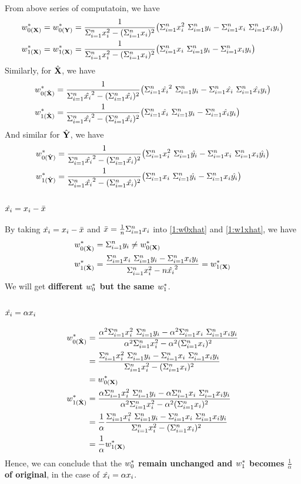 \documentclass[11pt,a4paper]{article}
\begin{document}
From above series of computatoin, we have
\begin{align}
    w_{0(\X)}^* = w_{0(\Y)}^* &= \deta  \big(\sxis \ \sy - \sxi \ \sxy\big) \\
    w_{1(\X)}^* = w_{1(\X)}^* &= \deta  \big(\sxi \ \sy -  \sxy\big) 
\end{align}
Similarly, for $\hat{\mathbf{X}} $, we have
\begin{align} \label{1:w0xhat}
    w_{0(\Xhat)}^* &= \detahat  \big(\sxihats \ \sy - \sxihat \ \sxhaty \big) \\
    w_{1(\Xhat)}^* &= \detahat  \big(\sxihat \ \sy -  \sxhaty \big)
    \label{1:w1xhat}
\end{align}
And similar for $\hat{\mathbf{Y}}$, we have
\begin{align}
    w_{0(\hat{\mathbf{Y}})}^* &= \frac{1}{\Sigma_{i=1}^{n} \hat{x_i}^2 - (\Sigma_{i=1}^{n} \hat{x_i})^2}  \big(\Sigma_{i=1}^{n} x_i^2 \ \Sigma_{i=1}^{n} \hat{y_i} - \Sigma_{i=1}^{n} x_i \ \Sigma_{i=1}^{n} x_i \hat{y_i} \big) \\
    w_{1(\hat{\mathbf{Y}})}^* &= \frac{1}{\Sigma_{i=1}^{n} \hat{x_i}^2 - (\Sigma_{i=1}^{n} \hat{x_i})^2}  \big(\Sigma_{i=1}^{n} x_i \ \Sigma_{i=1}^{n} \hat{y_i} -  \Sigma_{i=1}^{n} x_i \hat{y_i} \big)
\end{align}

\newpage
\subsection{$\hat{x_i} = x_i - \bar{x}$}
By taking $\hat{x_i} = x_i - \bar{x}$ and $\bar{x} = \frac{1}{n} \Sigma_{i=1}^{n} x_i$ into \eqref{1:w0xhat} and \eqref{1:w1xhat},
we have 
\begin{align}
    w_{0(\hat{\mathbf{X}} )}^* &= \Sigma_{i=1}^{n} y_i  \neq w_{0(\mathbf{X})}^* \\
    w_{1(\hat{\mathbf{X}} )}^* &=  \frac{\Sigma_{i=1}^{n} x_i \ \Sigma_{i=1}^{n} y_i -  \Sigma_{i=1}^{n} x_i y_i}{\Sigma_{i=1}^{n} x_i^2 - n \hat{x_i}^2} 
    = w_{1(\mathbf{X})}^*
\end{align}
We will get {\bf different $w_0^*$ but the same $w_1^*$}.

\newcommand{\at}{\alpha^2}
\subsection{$\hat{x_i} = \alpha x_i$}

\begin{align}
    w_{0(\Xhat)}^* &= \frac{\at \sxis \ \sy - \at \sxi \ \sxy}{\at \sxis - \at
        (\sxi)^2} \\
        &= \frac{ \sxis \ \sy - \sxi \ \sxy}{\sxis - (\sxi)^2} \\
        &= w_{0(\X)}^* \\
    w_{1(\Xhat)}^* &= \frac{\alpha \sxis \ \sy - \alpha \sxi \ \sxy}{\at \sxis - \at
        (\sxi)^2} \\
    &= \frac{1}{\alpha} \frac{ \sxis \ \sy - \sxi \ \sxy}{\sxis -  (\sxi)^2} \\
        &= \frac{1}{\alpha} w_{1(\X)}^* 
\end{align}
Hence, we can conclude that the {\bf $w_0^*$ remain unchanged and $w_1^*$ becomes
    $\frac{1}{\alpha}$ of original}, in the case of $\hat{x_i} = \alpha x_i$.
\end{document}
